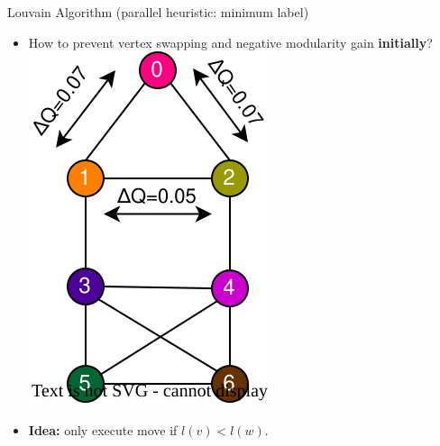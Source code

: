 \begin{frame}{Louvain Algorithm (parallel heuristic: minimum label)}
  \begin{itemize}
    \item<1-> How to prevent vertex swapping and negative modularity gain \textbf{initially}?
    \includegraphics[scale=0.8]{220523_distparallel.drawio.singlet_minimum_label.svg}
    \item<2-> \textbf{Idea:} only execute move if $l(v) < l(w)$.
  \end{itemize}
\end{frame}